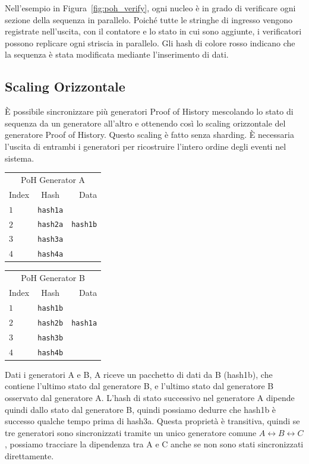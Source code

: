 \documentclass[12pt]{article}
\begin{document}
Nell'esempio in Figura~\ref{fig:poh_verify}, ogni nucleo è in grado di verificare ogni sezione della sequenza in parallelo. Poiché tutte le stringhe di ingresso vengono registrate nell'uscita, con il contatore e lo stato in cui sono aggiunte, i verificatori possono replicare ogni striscia in parallelo. Gli hash di colore rosso indicano che la sequenza è stata modificata mediante l'inserimento di dati.

\subsection{Scaling Orizzontale}\label{poh:scale}
È possibile sincronizzare più generatori Proof of History mescolando lo stato di sequenza da un generatore all'altro e ottenendo così lo scaling orizzontale del generatore Proof of History. Questo scaling è fatto senza sharding. È necessaria l'uscita di entrambi i generatori  per ricostruire l'intero ordine degli eventi nel sistema.

\begin{center}
  \begin{tabular}{|l c r|}

  \hline
    \multicolumn{3}{|c|}{PoH Generator A} \\
    Index & Hash & Data \\ \hline
    $1$ & \texttt{hash1a} & \\
    $2$ & \texttt{hash2a} & \texttt{hash1b} \\
    $3$ & \texttt{hash3a} & \\
    $4$ & \texttt{hash4a} & \\
    \hline
    \end{tabular}
  \begin{tabular}{| l  c  r |}
  \hline
    \multicolumn{3}{|c|}{PoH Generator B} \\
    Index & Hash & Data \\ \hline
    $1$ & \texttt{hash1b} & \\
    $2$ & \texttt{hash2b} & \texttt{hash1a} \\
    $3$ & \texttt{hash3b} & \\
    $4$ & \texttt{hash4b} & \\
    \hline
    \end{tabular}
\end{center}

Dati i generatori A e B, A riceve un pacchetto di dati da B (hash1b), che contiene l'ultimo stato dal generatore B, e l'ultimo stato dal generatore B osservato dal generatore A. L'hash di stato successivo nel generatore A dipende quindi dallo stato dal generatore B, quindi possiamo dedurre che hash1b è successo qualche tempo prima di hash3a. Questa proprietà è transitiva, quindi se tre generatori sono sincronizzati tramite un unico generatore comune \(A \leftrightarrow B \leftrightarrow C\), possiamo tracciare la dipendenza tra A e C anche se non sono stati sincronizzati direttamente.
\end{document}
